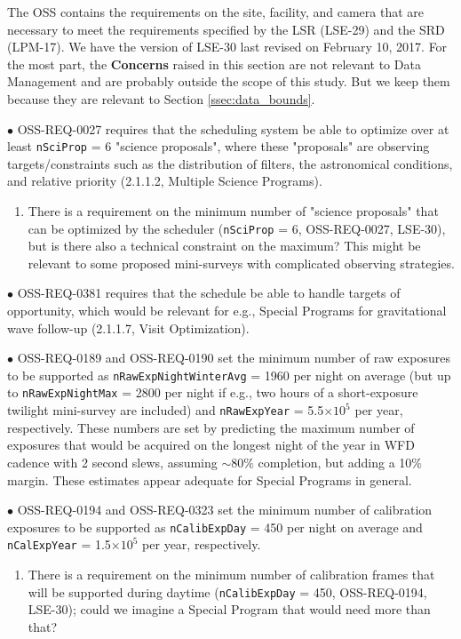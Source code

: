 \documentclass[DM,lsstdraft,toc]{lsstdoc}
\begin{document}
The OSS contains the requirements on the site, facility, and camera that are necessary to meet the requirements specified by the LSR (LSE-29) and the SRD (LPM-17). We have the version of LSE-30 last revised on February 10, 2017. For the most part, the {\bf Concerns} raised in this section are not relevant to Data Management and are probably outside the scope of this study. But we keep them because they are relevant to Section \ref{ssec:data_bounds}. 

$\bullet$ OSS-REQ-0027 requires that the scheduling system be able to optimize over at least {\tt nSciProp} = 6 "science proposals", where these "proposals" are observing targets/constraints such as the distribution of filters, the astronomical conditions, and relative priority (2.1.1.2, Multiple Science Programs). 
\begin{enumerate}[topsep=-10pt,after=\vspace{10pt},label= \textbf{Concern \Roman*.},resume] \item \label{OSS-1} There is a requirement on the minimum number of "science proposals" that can be optimized by the scheduler ({\tt nSciProp} = 6, OSS-REQ-0027, LSE-30), but is there also a technical constraint on the maximum? This might be relevant to some proposed mini-surveys with complicated observing strategies. \end{enumerate}

$\bullet$ OSS-REQ-0381 requires that the schedule be able to handle targets of opportunity, which would be relevant for e.g., Special Programs for gravitational wave follow-up (2.1.1.7, Visit Optimization).

$\bullet$ OSS-REQ-0189 and OSS-REQ-0190 set the minimum number of raw exposures to be supported as {\tt nRawExpNightWinterAvg} = 1960 per night on average (but up to {\tt nRawExpNightMax} = 2800 per night if e.g., two hours of a short-exposure twilight mini-survey are included) and {\tt nRawExpYear} = 5.5$\times10^5$ per year, respectively. These numbers are set by predicting the maximum number of exposures that would be acquired on the longest night of the year in WFD cadence with 2 second slews, assuming $\sim80\%$ completion, but adding a 10\% margin. These estimates appear adequate for Special Programs in general.

$\bullet$ OSS-REQ-0194 and OSS-REQ-0323 set the minimum number of calibration exposures to be supported as {\tt nCalibExpDay} = 450 per night on average and {\tt nCalExpYear} = 1.5$\times10^5$ per year, respectively. 
\begin{enumerate}[topsep=-10pt,after=\vspace{10pt},label= \textbf{Concern \Roman*.},resume] \item \label{OSS-2} There is a requirement on the minimum number of calibration frames that will be supported during daytime ({\tt nCalibExpDay} = 450, OSS-REQ-0194, LSE-30); could we imagine a Special Program that would need more than that? \end{enumerate}
\end{document}
